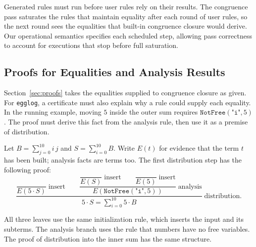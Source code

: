 Generated rules must run before user rules rely on their results.
The congruence pass saturates the rules that maintain equality after each round of user rules,
  so the next round sees the equalities that built-in congruence closure would derive.
Our operational semantics specifies each scheduled step,
  allowing pass correctness to account for executions that stop before full saturation.

\subsection{Proofs for Equalities and Analysis Results}
\label{sec:extension-proofs}

Section~\ref{sec:proofs} takes the equalities supplied to congruence closure as given.
For \texttt{egglog}, a certificate must also explain why a rule could supply each equality.
In the running example, moving $5$ inside the outer sum requires
  $\mathtt{NotFree}(\texttt{"i"},5)$.
The proof must derive this fact from the analysis rule,
  then use it as a premise of distribution.

\begin{samepage}
Let $B=\sum_{j=0}^{10}i\,j$ and $S=\sum_{i=0}^{10}B$.
Write $E(t)$ for evidence that the term $t$ has been built; analysis facts are terms too.
The first distribution step has the following proof:
\[
  \dfrac{
    \dfrac{}{E(5\cdot S)}\;\text{insert}
    \qquad
    \dfrac{
      \dfrac{}{E(S)}\;\text{insert}
      \qquad
      \dfrac{}{E(5)}\;\text{insert}
    }{E(\mathtt{NotFree}(\texttt{"i"},5))}\;\text{analysis}
  }{5\cdot S=\displaystyle\sum_{i=0}^{10}5\cdot B}\;\text{distribution}.
\]
\end{samepage}
All three leaves use the same initialization rule, which inserts the input and its subterms.
The analysis branch uses the rule that numbers have no free variables.
The proof of distribution into the inner sum has the same structure.

